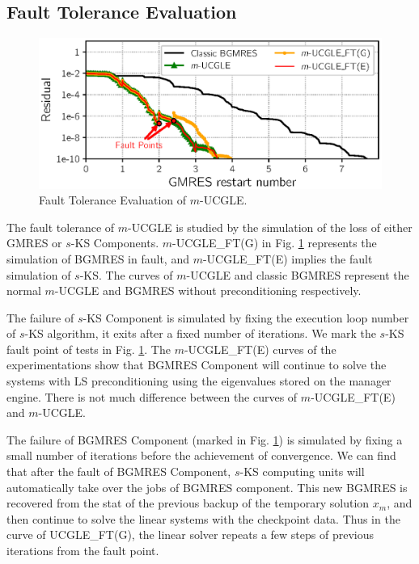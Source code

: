 \subsection{Fault Tolerance Evaluation}
\begin{figure}[t]
	\centering
	\includegraphics[width=.99\linewidth]{fig/convergence_ft.eps}
	\caption{Fault Tolerance Evaluation of $m$-UCGLE.}
	\label{fig:ft}
\end{figure}

The fault tolerance of $m$-UCGLE is studied by the simulation of the loss of either GMRES or $s$-KS Components. $m$-UCGLE\_FT(G) in Fig. \ref{fig:ft} represents the simulation of BGMRES in fault, and $m$-UCGLE\_FT(E) implies the fault simulation of $s$-KS. The curves of $m$-UCGLE and classic BGMRES represent the normal $m$-UCGLE and BGMRES without preconditioning respectively. 

The failure of $s$-KS Component is simulated by fixing the execution loop number of $s$-KS algorithm, it exits after a fixed number of iterations. We mark the $s$-KS fault point of tests in Fig. \ref{fig:ft}. The $m$-UCGLE\_FT(E) curves of the experimentations show that BGMRES Component will continue to solve the systems with LS preconditioning using the eigenvalues stored on the manager engine. There is not much difference between the curves of $m$-UCGLE\_FT(E) and $m$-UCGLE.

The failure of BGMRES Component (marked in Fig. \ref{fig:ft}) is simulated by fixing a small number of iterations before the achievement of convergence. We can find that after the fault of BGMRES Component, $s$-KS computing units will automatically take over the jobs of BGMRES component. This new BGMRES is recovered from the stat of the previous backup of the temporary solution $x_m$, and then continue to solve the linear systems with the checkpoint data.  Thus in the curve of UCGLE\_FT(G), the linear solver repeats a few steps of previous iterations from the fault point.


